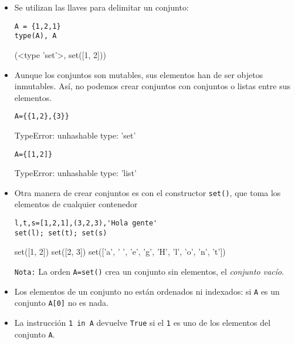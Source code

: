 \begin{itemize}
\item Se utilizan las llaves para delimitar un conjunto:
\begin{lstlisting}
A = {1,2,1}
type(A), A
\end{lstlisting}
\begin{Output}
	(<type 'set'>, set([1, 2]))
\end{Output}
\item Aunque los conjuntos son mutables, sus elementos han de ser objetos
inmutables. Así, no podemos crear conjuntos con conjuntos o listas entre sus
elementos.

\small
\label{unhash}
\noindent\begin{minipage}{.45\textwidth}
\begin{lstlisting}
A={{1,2},{3}}
\end{lstlisting}
\begin{Output}
TypeError: unhashable type: 'set'
\end{Output}
\end{minipage}\vrule\hfill
\begin{minipage}{.45\textwidth}
\begin{lstlisting}
A={[1,2]}
\end{lstlisting}
\begin{Output}
TypeError: unhashable type: 'list'
\end{Output} 
\end{minipage}
\normalsize
\item Otra manera de crear conjuntos es con el constructor \lstinline|set()|,
que toma los elementos de cualquier contenedor
\begin{lstlisting}[columns=fullflexible]
l,t,s=[1,2,1],(3,2,3),'Hola gente'
set(l); set(t); set(s)
\end{lstlisting}
\begin{Output}
	set([1, 2])
	set([2, 3])
	set(['a', ' ', 'e', 'g', 'H', 'l', 'o', 'n', 't'])
\end{Output}
{\tt Nota:} La orden \lstinline|A=set()| crea un conjunto sin elementos, el
\emph{conjunto vacío}.

\item Los elementos de un conjunto no están ordenados ni indexados: si
\lstinline|A|
es un conjunto \lstinline|A[0]| no es nada.

\item  La instrucción \lstinline|1 in A| devuelve \lstinline|True| si el
\lstinline|1| es
uno de los elementos del conjunto \lstinline|A|.



\end{itemize}
